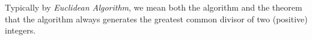 \documentclass{../ximera}
\begin{document}
			

					




Typically by \emph{Euclidean Algorithm}, we mean  both the algorithm and the theorem that the algorithm always generates the greatest common divisor of two (positive) integers.
\end{document}
